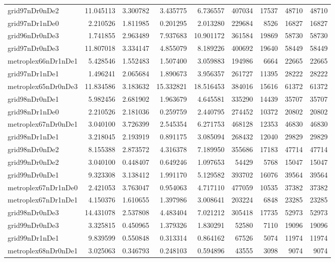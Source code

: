 \begin{longtable}{|l|r|r|r|r|r|r|r|r|}
grid97nDr0nDe2 & 11.045113 & 3.300782 & 3.435775 & 6.736557 & 407034 & 17537 & 48710 & 48710 \\
grid97nDr1nDe0 & 2.210526 & 1.811985 & 0.201295 & 2.013280 & 229684 & 8526 & 16827 & 16827 \\
grid96nDr0nDe3 & 1.741855 & 2.963489 & 7.937683 & 10.901172 & 361584 & 19869 & 58730 & 58730 \\
grid97nDr0nDe3 & 11.807018 & 3.334147 & 4.855079 & 8.189226 & 400692 & 19640 & 58449 & 58449 \\
metroplex66nDr1nDe1 & 5.428546 & 1.552483 & 1.507400 & 3.059883 & 194986 & 6664 & 22665 & 22665 \\
grid97nDr1nDe1 & 1.496241 & 2.065684 & 1.890673 & 3.956357 & 261727 & 11395 & 28222 & 28222 \\
metroplex65nDr0nDe3 & 11.834586 & 3.183632 & 15.332821 & 18.516453 & 384016 & 15616 & 61372 & 61372 \\
grid98nDr0nDe1 & 5.982456 & 2.681902 & 1.963679 & 4.645581 & 335290 & 14439 & 35707 & 35707 \\
grid98nDr1nDe0 & 2.210526 & 2.181036 & 0.259759 & 2.440795 & 274452 & 10372 & 20802 & 20802 \\
metroplex67nDr0nDe1 & 3.040100 & 3.726399 & 2.545354 & 6.271753 & 468128 & 12353 & 46830 & 46830 \\
grid98nDr1nDe1 & 3.218045 & 2.193919 & 0.891175 & 3.085094 & 268432 & 12040 & 29829 & 29829 \\
grid98nDr0nDe2 & 8.155388 & 2.873572 & 4.316378 & 7.189950 & 355686 & 17183 & 47714 & 47714 \\
grid99nDr0nDe2 & 3.040100 & 0.448407 & 0.649246 & 1.097653 & 54429 & 5768 & 15047 & 15047 \\
grid99nDr0nDe1 & 9.323308 & 3.138412 & 1.991170 & 5.129582 & 393702 & 16076 & 39564 & 39564 \\
metroplex67nDr1nDe0 & 2.421053 & 3.763047 & 0.954063 & 4.717110 & 477059 & 10535 & 37382 & 37382 \\
metroplex67nDr1nDe1 & 4.150376 & 1.610655 & 1.397986 & 3.008641 & 203224 & 6848 & 23285 & 23285 \\
grid98nDr0nDe3 & 14.431078 & 2.537808 & 4.483404 & 7.021212 & 305418 & 17735 & 52973 & 52973 \\
grid99nDr0nDe3 & 3.325815 & 0.450965 & 1.379326 & 1.830291 & 52580 & 7110 & 19096 & 19096 \\
grid99nDr1nDe1 & 9.839599 & 0.550848 & 0.313314 & 0.864162 & 67526 & 5074 & 11974 & 11974 \\
metroplex68nDr0nDe1 & 3.025063 & 0.346793 & 0.248103 & 0.594896 & 43555 & 3098 & 9074 & 9074 \\

\end{longtable}
